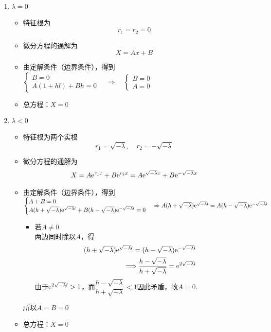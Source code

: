 \begin{enumerate}
	\item $\lambda = 0$
	\begin{itemize}
		\item 特征根为
		\begin{equation*}
			r_1 = r_2 = 0
		\end{equation*}
		\item 微分方程的通解为
		\begin{equation}
			X = Ax + B
		\end{equation}
		\item 由定解条件（边界条件），得到
		$
		\begin{cases}
			B = 0\\
			A(1 + hl) + Bh = 0
		\end{cases}
		\quad \Rightarrow \quad
		\begin{cases}
			B = 0\\
			A = 0
		\end{cases}
		$
		\item 总方程：$X = 0$
	\end{itemize}
	
	\item $\lambda < 0$
	\begin{itemize}
		\item 特征根为两个实根
	\begin{equation*}
		r_1 = \sqrt{- \lambda }, \quad  r_2 = -  \sqrt{- \lambda }
	\end{equation*}
	\item 微分方程的通解为
	\begin{equation}
		X = A{\rm{e}}^{r_1x}+B{\rm{e}}^{r_2x} = A{\rm{e}}^{\sqrt{- \lambda }x}+B{\rm{e}}^{-\sqrt{- \lambda }x} 
	\end{equation}
	\item 由定解条件（边界条件），得到
	$
	\begin{cases}
		A + B= 0\\
		A(h + \sqrt{-\lambda}){\rm{e}}^{\sqrt{- \lambda }l} + B (h - \sqrt{- \lambda}){\rm{e}}^{-\sqrt{- \lambda }l}= 0
	\end{cases}
	\Rightarrow A(h + \sqrt{-\lambda}){\rm{e}}^{\sqrt{- \lambda }l} = A (h - \sqrt{- \lambda}){\rm{e}}^{-\sqrt{- \lambda }l}
	$
	\begin{itemize}
		\item 若$A \neq 0$\\
		两边同时除以$A$，得
		\begin{align*}
			(h + \sqrt{-\lambda}){\rm{e}}^{\sqrt{- \lambda }l} = (h - \sqrt{- \lambda}){\rm{e}}^{-\sqrt{- \lambda }l}\\
			\Longrightarrow \dfrac{h - \sqrt{-\lambda}}{h + \sqrt{- \lambda}} = {\rm{e}}^{2\sqrt{- \lambda }l}
		\end{align*}
	由于${\rm{e}}^{2\sqrt{- \lambda }l} > 1$，而$\dfrac{h - \sqrt{-\lambda}}{h + \sqrt{- \lambda}} < 1$因此矛盾，故$A = 0$.
	\end{itemize}
	所以$A = B = 0$
	\item 总方程：$X = 0$
	\end{itemize}
	

\end{enumerate}
